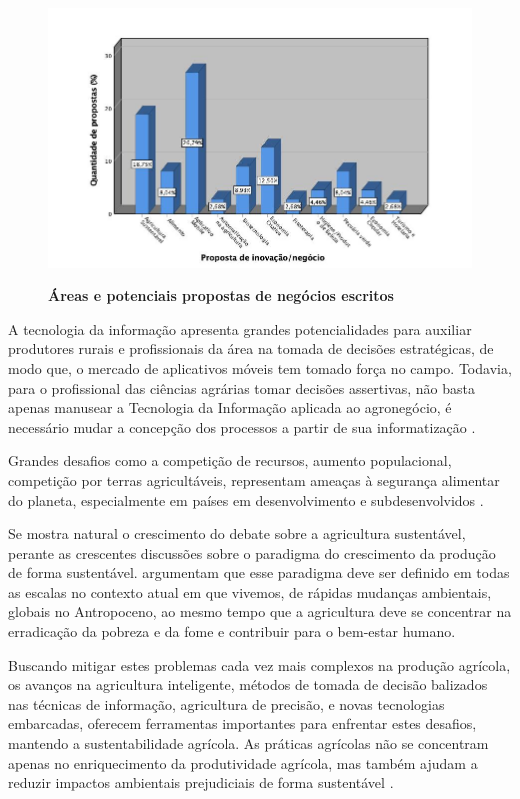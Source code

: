\begin{figure}[H]
\centering
\caption{\textbf{Áreas e potenciais propostas de negócios escritos}}
\includegraphics[scale=0.4]{Imagens/propostas_negocios.jpg}
\label{figura_11}
\end{figure}

A tecnologia da informação apresenta grandes potencialidades para auxiliar produtores rurais e profissionais da área na tomada de decisões estratégicas, de modo que, o mercado de aplicativos móveis tem tomado força no campo. Todavia, para o profissional das ciências agrárias tomar decisões assertivas, não basta apenas manusear a Tecnologia da Informação aplicada ao agronegócio, é necessário mudar a concepção dos processos a partir de sua informatização \cite{ferraz_tecnologia_2017,sharma_systematic_2020}.

Grandes desafios como a competição de recursos, aumento populacional, competição por terras agricultáveis, representam ameaças à segurança alimentar do planeta, especialmente em países em desenvolvimento e subdesenvolvidos \cite{pardey_bounds_2014}.

Se mostra natural o crescimento do debate sobre a agricultura sustentável, perante as crescentes discussões sobre o paradigma do crescimento da produção de forma sustentável.
 argumentam que esse paradigma deve ser definido em todas as escalas no contexto atual em que vivemos, de rápidas mudanças ambientais, globais no Antropoceno, ao mesmo tempo que a agricultura  deve se concentrar na erradicação da pobreza e da fome e contribuir para o bem-estar humano.

Buscando mitigar estes problemas cada vez mais complexos na produção agrícola, os avanços na agricultura inteligente, métodos de tomada de decisão balizados nas técnicas de informação, agricultura de precisão, e novas tecnologias embarcadas, oferecem ferramentas importantes para enfrentar estes desafios, mantendo a sustentabilidade agrícola. As práticas agrícolas não se concentram apenas no enriquecimento da produtividade agrícola, mas também ajudam a reduzir impactos ambientais prejudiciais de forma sustentável \cite{adnan_effects_2018,rockstrom_sustainable_2017,ye_bio-organic_2020}.

